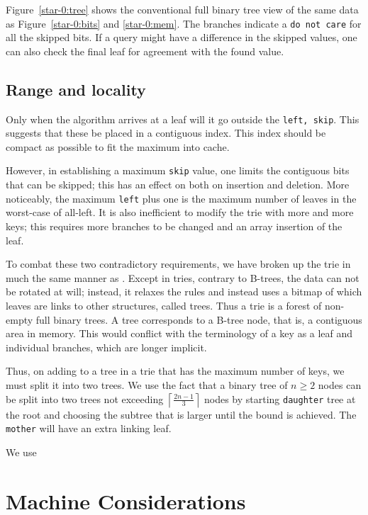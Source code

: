 \documentclass[12pt]{article}
\newcommand{\code}[1]{\colorbox{light-gray}{\texttt{#1}}}
\begin{document}
Figure~\ref{star-0:tree} shows the conventional full binary tree view of the same data as Figure~\ref{star-0:bits} and \ref{star-0:mem}. The branches indicate a \code{do not care} for all the skipped bits. If a query might have a difference in the skipped values, one can also check the final leaf for agreement with the found value.

\subsection{Range and locality}

Only when the algorithm arrives at a leaf will it go outside the \code{left, skip}. This suggests that these be placed in a contiguous index. This index should be compact as possible to fit the maximum into cache.

However, in establishing a maximum \code{skip} value, one limits the contiguous bits that can be skipped; this has an effect on both on insertion and deletion. More noticeably, the maximum \code{left} plus one is the maximum number of leaves in the worst-case of all-left. It is also inefficient to modify the trie with more and more keys; this requires more branches to be changed and an array insertion of the leaf.

To combat these two contradictory requirements, we have broken up the trie in much the same manner as \cite{bayer1972organization}. Except in tries, contrary to B-trees, the data can not be rotated at will; instead, it relaxes the rules and instead uses a bitmap of which leaves are links to other structures, called trees. Thus a trie is a forest of non-empty full binary trees. A tree corresponds to a B-tree node\cite{knuth1997sorting}, that is, a contiguous area in memory. This would conflict with the terminology of a key as a leaf and individual branches, which are longer implicit.

Thus, on adding to a tree in a trie that has the maximum number of keys, we must split it into two trees. We use the fact that a binary tree of $n \ge 2$ nodes can be split into two trees not exceeding $\left\lceil \frac{2n-1}{3} \right\rceil$ nodes by starting \code{daughter} tree at the root and choosing the subtree that is larger until the bound is achieved. The \code{mother} will have an extra linking leaf.

We use

\section{Machine Considerations}
\end{document}
